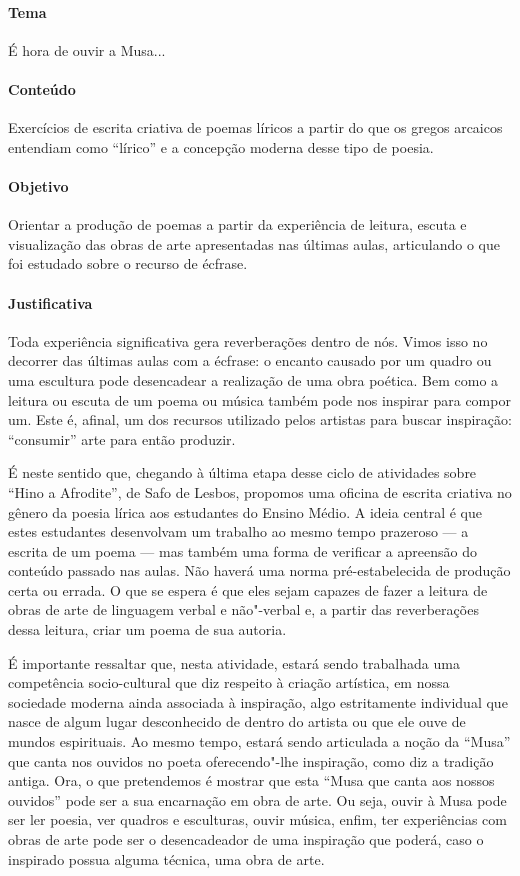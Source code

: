 \documentclass[12pt]{extarticle}
\begin{document}
\paragraph{Tema} É hora de ouvir a Musa...  

\paragraph{Conteúdo} Exercícios de escrita criativa de poemas líricos a partir
do que os gregos arcaicos entendiam como ``lírico'' e a concepção moderna
desse tipo de poesia. 

\paragraph{Objetivo} Orientar a produção de poemas a partir da experiência
de leitura, escuta e visualização das obras de arte apresentadas nas últimas
aulas, articulando o que foi estudado sobre o recurso de écfrase.

\paragraph{Justificativa} Toda experiência significativa gera reverberações
dentro de nós. Vimos isso no decorrer das últimas aulas com a écfrase: o 
encanto causado por um quadro ou uma escultura pode desencadear a realização
de uma obra poética. Bem como a leitura ou escuta de um poema ou música 
também pode nos inspirar para compor um. Este é, afinal, um dos recursos
utilizado pelos artistas para buscar inspiração: ``consumir'' arte para
então produzir. 

É neste sentido que, chegando à última etapa desse ciclo de atividades sobre
``Hino a Afrodite'', de Safo de Lesbos, propomos uma oficina de escrita criativa
no gênero da poesia lírica aos estudantes do Ensino Médio. A ideia central
é que estes estudantes desenvolvam um trabalho ao mesmo tempo prazeroso ---
a escrita de um poema --- mas também uma forma de verificar a apreensão do
conteúdo passado nas aulas. Não haverá uma norma pré-estabelecida de
produção certa ou errada. O que se espera é que eles sejam capazes de fazer
a leitura de obras de arte de linguagem verbal e não"-verbal e, a partir
das reverberações dessa leitura, criar um poema de sua autoria. 

É importante ressaltar que, nesta atividade, estará sendo trabalhada uma 
competência socio-cultural que diz respeito à criação artística, em nossa
sociedade moderna ainda associada à inspiração, algo estritamente individual
que nasce de algum lugar desconhecido de dentro do artista ou que ele ouve
de mundos espirituais. Ao mesmo tempo, estará sendo articulada a noção da ``Musa''
que canta nos ouvidos no poeta oferecendo"-lhe inspiração, como diz a tradição
antiga. Ora, o que pretendemos é mostrar que esta ``Musa que canta aos nossos
ouvidos'' pode ser a sua encarnação em obra de arte. Ou seja, ouvir à Musa
pode ser ler poesia, ver quadros e esculturas, ouvir música, enfim, ter 
experiências com obras de arte pode ser o desencadeador de uma inspiração
que poderá, caso o inspirado possua alguma técnica, uma obra de arte.
\end{document}
